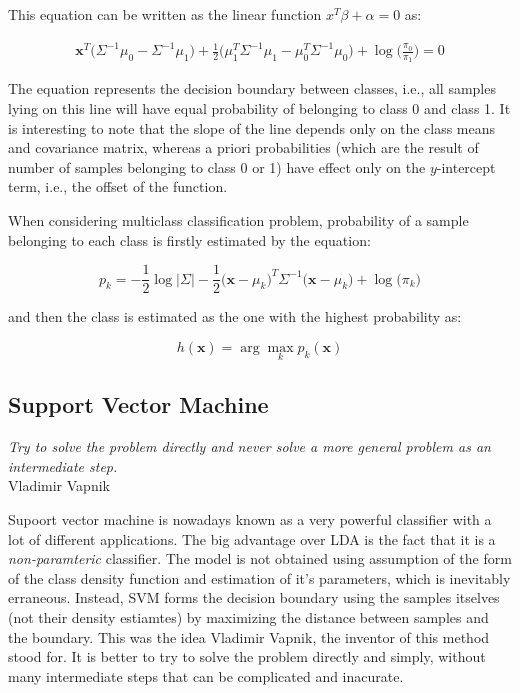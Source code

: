 \documentclass{article}
\newcommand{\argmax}{\arg\!\max} %
\begin{document}
This equation can be written as the linear function $x^T\beta + \alpha = 0$ as:

\begin{equation} 
\begin{split}
\mathbf{x}^T\Big(\Sigma^{-1} \mu_0 - \Sigma^{-1} \mu_1\Big) + \frac{1}{2} \Big(\mu_1^T \Sigma^{-1}\mu_1 - \mu_0^T \Sigma^{-1}\mu_0\Big)
+ \log\Big( \frac{\pi_0}{\pi_1}  \Big) = 0
\end{split}
\end{equation}

The equation represents the decision boundary between classes, i.e., all samples lying on this line will have equal probability of belonging to class 0 and class 1. It is interesting to note that the slope of the line depends only on the class means and covariance matrix, whereas a priori probabilities (which are the result of number of samples belonging to class 0 or 1) have effect only on the $y$-intercept term, i.e., the offset of the function.

When considering multiclass classification problem, probability of a sample belonging to each class is firstly estimated by the equation:

\begin{equation}
p_k = -\frac{1}{2} \log \big\vert \Sigma \big\vert - \frac{1}{2}  \Big(\mathbf{x}-\mu_k\Big)^T  \Sigma^{-1} \Big(\mathbf{x}-\mu_k\Big) +  \log{\Big(\pi_k\Big)}
\end{equation}

and then the class is estimated as the one with the highest probability as:

\begin{equation} 
h(\mathbf{x}) = \argmax_k p_k(\mathbf{x})
\end{equation}


\subsection{Support Vector Machine}

\begin{myquote}
\begin{flushright}
\textit{Try to solve the problem directly and never solve a more general problem as an intermediate step.} \\Vladimir Vapnik
\end{flushright}
\end{myquote}


Supoort vector machine is nowadays known as a very powerful classifier with a lot of different applications. The big advantage over LDA is the fact that it is a \emph{non-paramteric} classifier. The model is not obtained using assumption of the form of the class density function and estimation of it's parameters, which is inevitably erraneous. Instead, SVM forms the decision boundary using the samples itselves (not their density estiamtes) by maximizing the distance between samples and the boundary.
This was the idea Vladimir Vapnik, the inventor of this method stood for. It is better to try to solve the problem directly and simply, without many intermediate steps that can be complicated and inacurate.
\end{document}
